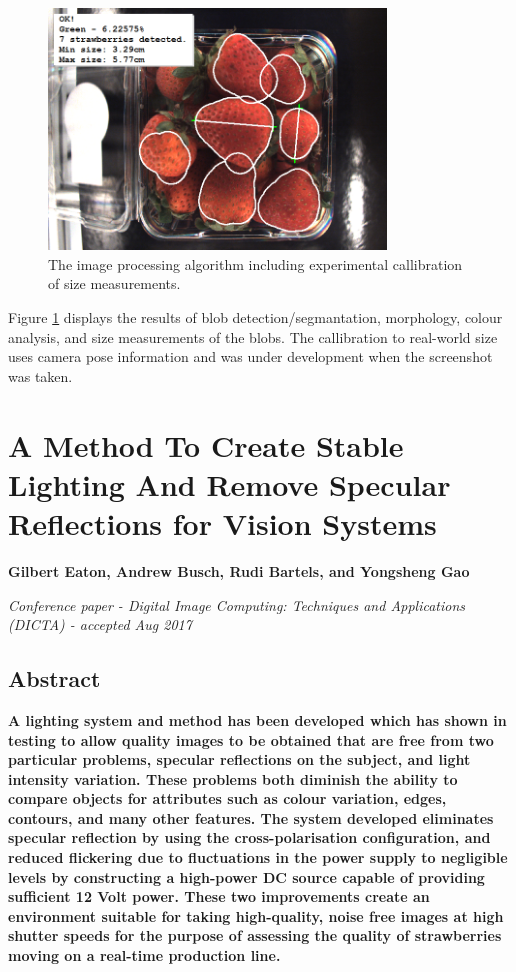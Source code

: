 \documentclass[fleqn,twoside,12pt]{report}
\begin{document}
\begin{figure}[h!]
	\centering
	\includegraphics[width=0.8\textwidth]{seg_4.png}
	\caption{The image processing algorithm including experimental callibration of size measurements.}
	\label{fig:seg_4}
\end{figure}  


Figure \ref{fig:seg_4} displays the results of blob detection/segmantation, morphology, colour analysis, and size measurements of the blobs. The callibration to real-world size uses camera pose information and was under development when the screenshot was taken. 



\newpage
\chapter{A Method To Create Stable Lighting And Remove Specular Reflections for Vision Systems}
\label{sec:paper_1}

\textbf{Gilbert Eaton, Andrew Busch, Rudi Bartels, and Yongsheng Gao}

\textit{Conference paper - Digital Image Computing: Techniques and Applications (DICTA) - accepted Aug 2017}


\section{Abstract}

\textbf{A lighting system and method has been developed which has shown in testing to allow quality images to be obtained that are free from two particular problems, specular reflections on the subject, and light intensity variation. These problems both diminish the ability to compare objects for attributes such as colour variation, edges, contours, and many other features. The system developed eliminates specular reflection by using the cross-polarisation configuration, and reduced flickering due to fluctuations in the power supply to negligible levels by constructing a high-power DC source capable of providing sufficient 12 Volt power. These two improvements create an environment suitable for taking high-quality, noise free images at high shutter speeds for the purpose of assessing the quality of strawberries moving on a real-time production line.}
\end{document}
